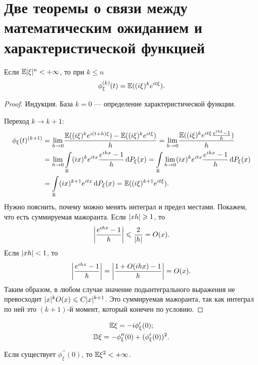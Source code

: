 \section{Две теоремы о связи между математическим ожиданием и характеристической функцией}

\begin{theorem}
    Если $\EE \abs{\xi}^n < +\infty$, то при $k\le n$ 
    $$\phi_\xi^{(k)}(t) = \EE ((i\xi)^ke^{it\xi}).$$
\end{theorem}

\begin{proof}
    Индукция. База $k = 0$ --- определение характеристической функции.

    Переход $k\rightarrow k + 1$:
   \begin{align*}
       \phi_\xi(t)^{(k+ 1)} &= \underset{h\rightarrow 0}{\lim} \frac{\EE ((i\xi)^ke^{i(t+h)\xi}) - \EE ((i\xi)^ke^{it\xi})}{h} =
        \underset{h\rightarrow 0}{\lim} \frac{\EE ((i\xi)^ke^{it\xi}\frac{e^{ih\xi} - 1}{h})}{h} \\&=
        \underset{h\rightarrow 0}{\lim} \int\limits_\mathbb{R} (ix)^ke^{itx}\frac{e^{ihx} - 1}{h}\dd P_\xi(x) =
        \int\limits_\mathbb{R}  \underset{h\rightarrow 0}{\lim}  (ix)^ke^{itx}\frac{e^{ihx} - 1}{h}\dd P_\xi(x) \\&=
        \int\limits_\mathbb{R} (ix)^{k + 1}e^{itx}\dd P_\xi(x) = \EE ((i\xi)^{k+1}e^{it\xi}).
   \end{align*}
   Нужно пояснить, почему можно менять интеграл и предел местами. Покажем, что есть суммируемая мажоранта.
   Если $\abs{xh}\ge 1$, то
   $$ \abs*{\frac{e^{ihx} - 1}{h}}\le \frac{2}{\abs{h}} = O(x).$$
Если $\abs{xh}< 1$, то
$$\abs*{\frac{e^{ihx} - 1}{h}} = \abs*{\frac{1 + O(ihx) - 1}{h}} = O(x).$$
Таким образом, в любом случае значение подынтегрального выражения не превосходит $\abs{x}^kO(x) \le C\abs{x}^{k + 1}$. Это суммируемая мажоранта, так как интеграл по ней это $(k + 1)$-й момент, который конечен по условию.
\end{proof}

\begin{corollary}
\begin{gather*}
    \EE \xi = -i\phi_\xi^\prime(0);\\
    \DD\xi = -\phi_\xi^{\prime \prime}(0) + (\phi_\xi^\prime(0))^2.
\end{gather*}
    \end{corollary}


\begin{theorem}
    Если существует $\phi_\xi^{\prime \prime}(0)$, то $\EE \xi^2 < + \infty$.
\end{theorem}

